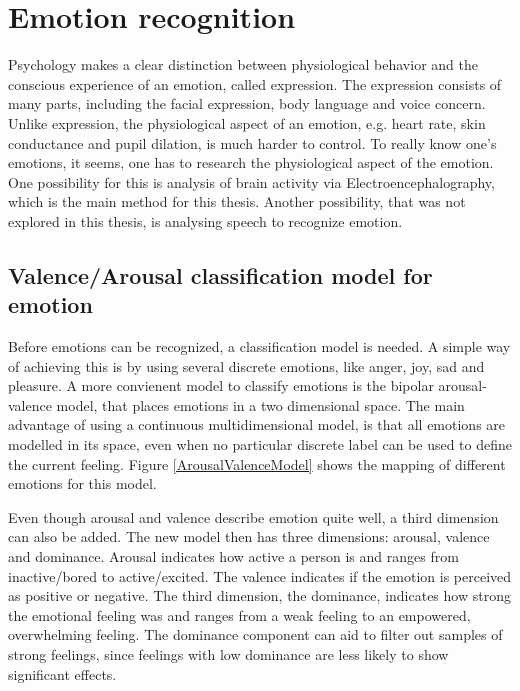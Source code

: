 \section{Emotion recognition}

Psychology makes a clear distinction between physiological behavior and the conscious experience of an emotion, called expression\cite{ExtendedPaper}. The expression consists of many parts, including the facial expression, body language and voice concern. Unlike expression, the physiological aspect of an emotion, e.g. heart rate, skin conductance and pupil dilation, is much harder to control. To really know one's emotions, it seems, one has to research the physiological aspect of the emotion. One possibility for this is analysis of brain activity via Electroencephalography\cite{EEGDatasets}, which is the main method for this thesis. Another possibility, that was not explored in this thesis, is analysing speech to recognize emotion\citep{EMSpeech}. 

\subsection{Valence/Arousal classification model for emotion}
\label{valarrdomspace}

Before emotions can be recognized, a classification model is needed. A simple way of achieving this is by using several discrete emotions, like anger, joy, sad and pleasure. A more convienent model to classify emotions is the bipolar arousal-valence model\cite{ExtendedPaper,RealTimeEEGEmotion}, that places emotions in a two dimensional space. The main advantage of using a continuous multidimensional model, is that all emotions are modelled in its space, even when no particular discrete label can be used to define the current feeling. Figure \ref{ArousalValenceModel} shows the mapping of different emotions for this model. 

\npar
Even though arousal and valence describe emotion quite well, a third dimension can also be added. The new model then has three dimensions: arousal, valence and dominance. Arousal indicates how active a person is and ranges from inactive/bored to active/excited. The valence indicates if the emotion is perceived as positive or negative. The third dimension, the dominance, indicates how strong the emotional feeling was and ranges from a weak feeling to an empowered, overwhelming feeling. The dominance component can aid to filter out samples of strong feelings, since feelings with low dominance are less likely to show significant effects.


